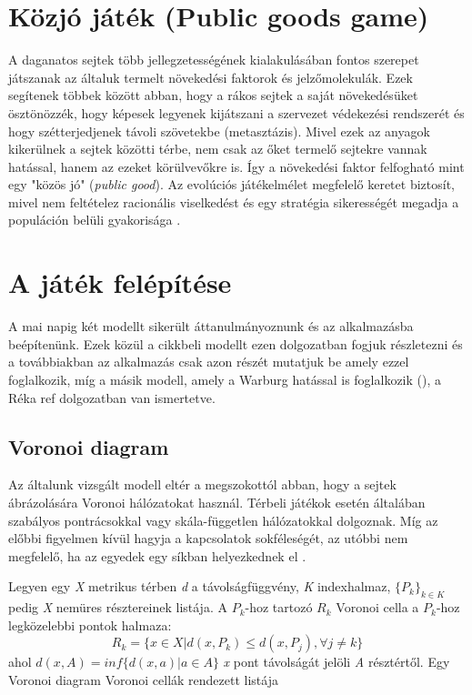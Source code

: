 \section{Közjó játék (Public goods game)}
A daganatos sejtek több jellegzetességének kialakulásában fontos szerepet játszanak az általuk termelt növekedési faktorok és jelzőmolekulák. Ezek segítenek többek között abban, hogy a rákos sejtek a saját növekedésüket ösztönözzék, hogy képesek legyenek kijátszani a szervezet védekezési rendszerét és hogy szétterjedjenek távoli szövetekbe (metasztázis). Mivel ezek az anyagok kikerülnek a sejtek közötti térbe, nem csak az őket termelő sejtekre vannak hatással, hanem az ezeket körülvevőkre is. Így a növekedési faktor felfogható mint egy "közös jó" (\textit{public good}). Az evolúciós játékelmélet megfelelő keretet biztosít, mivel nem feltételez racionális viselkedést és egy stratégia sikerességét megadja a populáción belüli gyakorisága \cite{archetti2016cooperation}.

\section{A játék felépítése}

A mai napig két modellt sikerült áttanulmányoznunk és az alkalmazásba beépítenünk. Ezek közül a \cite{archetti2016cooperation} cikkbeli modellt ezen dolgozatban fogjuk részletezni és a továbbiakban az alkalmazás csak azon részét mutatjuk be amely ezzel foglalkozik, míg a másik modell, amely a Warburg hatással is foglalkozik (\cite{archetti2014evolutionary}), a {\color{red} Réka ref} dolgozatban van ismertetve. 

\subsection{Voronoi diagram}
Az általunk vizsgált modell eltér a megszokottól abban, hogy a sejtek ábrázolására Voronoi hálózatokat használ. Térbeli játékok esetén általában szabályos pontrácsokkal vagy skála-független hálózatokkal dolgoznak. Míg az előbbi figyelmen kívül hagyja a kapcsolatok sokféleségét, az utóbbi nem megfelelő, ha az egyedek egy síkban helyezkednek el \cite{archetti2016cooperation}.

Legyen egy \textit{X} metrikus térben \textit{d} a távolságfüggvény, \textit{K} indexhalmaz, \(\{P_k\}_{k \in K}\) pedig \textit{X} nemüres résztereinek listája. A \(P_k\)-hoz tartozó \(R_k\) Voronoi cella a \(P_k\)-hoz legközelebbi pontok halmaza: 
\begin{equation}
R_k = \{x \in X | d(x,P_k) \leq d(x,P_j), \forall j \neq k\}
\end{equation}
ahol \(d(x,A) = inf\{d(x,a)|a \in A\}\) \textit{x} pont távolságát jelöli \textit{A} résztértől. Egy Voronoi diagram Voronoi cellák rendezett listája
  

